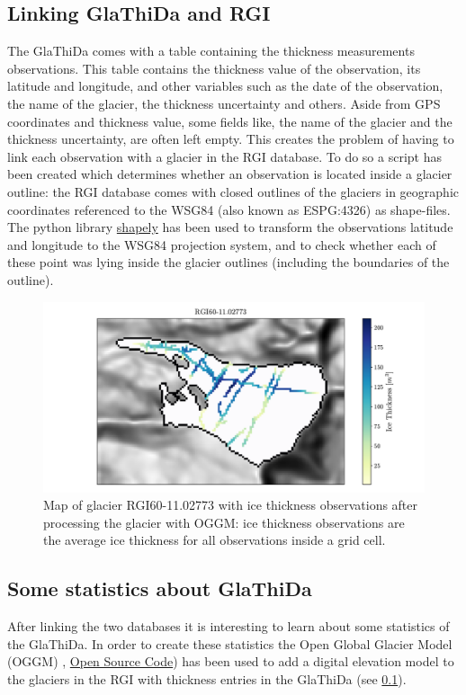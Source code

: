\subsection{Linking GlaThiDa and RGI}\label{GlaRGI}
The GlaThiDa comes with a table containing the thickness measurements observations. This table contains the thickness value of the observation, its latitude and longitude, and other variables such as the date of the observation, the name of the glacier, the thickness uncertainty and others. Aside from GPS coordinates and thickness value, some fields like, the name of the glacier and the thickness uncertainty, are often left empty. This creates the problem of having to link each observation with a glacier in the RGI database. To do so a script has been created which determines whether an observation is located inside a glacier outline: the RGI database comes with closed outlines of the glaciers in geographic coordinates referenced to the WSG84 (also known as ESPG:4326) as shape-files. The python library \href{https://github.com/Toblerity/Shapely}{shapely} has been used to transform the observations latitude and longitude to the WSG84 projection system, and to check whether each of these point was lying inside the glacier outlines (including the boundaries of the outline).

\begin{figure}\label{fig:thickness-pt} 
	\centering 
	\includegraphics[width=1.0\textwidth]{./figures/glathida_thick_map.pdf}
	\caption{Map of glacier RGI60-11.02773 with ice thickness observations after processing the glacier with OGGM: ice thickness observations are the average ice thickness for all observations inside a grid cell.}
\end{figure}

\subsection{Some statistics about GlaThiDa}
After linking the two databases it is interesting to learn about some statistics of the GlaThiDa. In order to create these statistics the Open Global Glacier Model (OGGM) \citep{OGGM2019}, \href{https://github.com/OGGM/oggm}{Open Source Code}) has been used to add a digital elevation model to the glaciers in the RGI with thickness entries in the GlaThiDa (see \ref{GlaRGI}).

